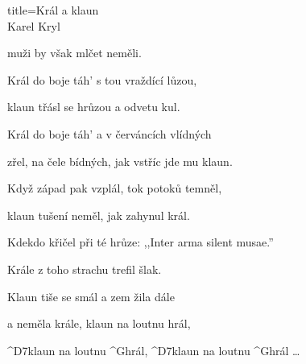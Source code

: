 \begin{song}{title=\centering Král a klaun \\\normalsize Karel Kryl  \vspace*{-0.3cm}}
{	muži by však mlčet neměli.

	Král do boje táh' s tou vraždící lůzou,

	klaun třásl se hrůzou a odvetu kul.

\sloka
	Král do boje táh' a v červáncích vlídných

	zřel, na čele bídných, jak vstříc jde mu klaun.

	Když západ pak vzplál, tok potoků temněl,

	klaun tušení neměl, jak zahynul král.

	Kdekdo křičel při té hrůze: ,,Inter arma silent musae.''

	Krále z toho strachu trefil šlak.

	Klaun tiše se smál a zem žila dále
	
	a neměla krále, klaun na loutnu hrál,

	^{D7}klaun na loutnu ^{G}hrál, ^{D7}klaun na loutnu ^{G}hrál \ldots




}
\setcounter{Slokočet}{0}
\end{song}
